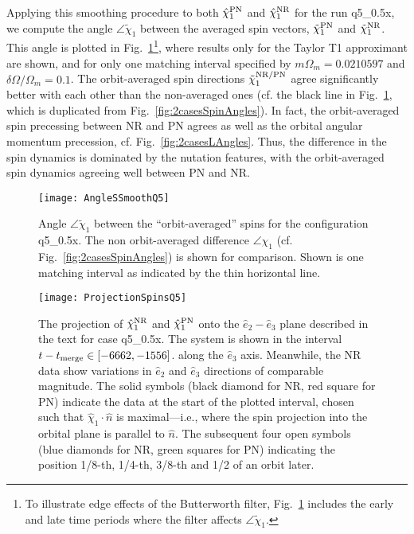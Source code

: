 \documentclass[aps,prd,amsmath,floatfix,twocolumn,superscriptaddress,nofootinbib,showpacs]{revtex4-1}
\begin{document}
Applying this smoothing procedure to both $\hat\chi_1^{\rm PN}$ and
$\hat\chi_1^{\rm NR}$ for the run q5\_0.5x, we compute the angle
$\angle\tilde\chi_1$ between the averaged spin vectors,
$\tilde\chi_1^{\rm PN}$ and $\tilde\chi_1^{\rm NR}$.  This angle is
plotted in Fig.~\ref{fig:AngleSmoothedS2cases}\footnote{To illustrate
  edge effects of the Butterworth filter,
  Fig.~\ref{fig:AngleSmoothedS2cases} includes the early and late time
  periods where the filter affects $\angle\tilde\chi_1$.}, where
results only for the Taylor T1 approximant are shown, and for only one
matching interval specified by $m\Omega_m=0.0210597$ and
$\delta\Omega/\Omega_m=0.1$. The orbit-averaged spin directions
$\tilde\chi_1^{\rm NR/PN}$ agree significantly better with each other
than the non-averaged ones (cf. the black line in
Fig.~\ref{fig:AngleSmoothedS2cases}, which is duplicated from
Fig.~\ref{fig:2casesSpinAngles}).  In fact, the orbit-averaged spin
precessing between NR and PN agrees as well as the orbital angular
momentum precession, cf. Fig.~\ref{fig:2casesLAngles}.  Thus, the
difference in the spin dynamics is dominated by the nutation features,
with the orbit-averaged spin dynamics agreeing well between PN and NR.


\begin{figure}
  \texttt{[image: AngleSSmoothQ5]}
  \caption{ \label{fig:AngleSmoothedS2cases} Angle $\angle
    \tilde{\chi}_{1}$ between the ``orbit-averaged'' spins for the
    configuration q5\_0.5x.  The non orbit-averaged difference
    $\angle\chi_{1}$ (cf. Fig.~\ref{fig:2casesSpinAngles}) is shown
    for comparison.  Shown is one matching interval as indicated by
    the thin horizontal line.  }
\end{figure}


\begin{figure}
  \texttt{[image: ProjectionSpinsQ5]}
  \caption{ \label{fig:ProjectionSpinsQ5} The projection of
    $\hat{\chi}_{1}^{\rm NR}$ and $\hat{\chi}_{1}^{\rm PN}$ onto the
    $\hat{e}_{2}-\hat{e}_{3}$ plane described in the text for case
    q5\_0.5x.  The system is shown in the interval $t-t_{\rm
      merge}\in[-6662,-1556]$.  along the $\hat{e}_{3}$
    axis. Meanwhile, the NR data show variations in $\hat{e}_{2}$ and
    $\hat{e}_{3}$ directions of comparable magnitude. The solid
    symbols (black diamond for NR, red square for PN) indicate the
    data at the start of the plotted interval, chosen such that
    $\hat\chi_1\cdot\hat n$ is maximal---i.e., where the spin
    projection into the orbital plane is parallel to $\hat n$.  The
    subsequent four open symbols (blue diamonds for NR, green squares
    for PN) indicating the position 1/8-th, 1/4-th, 3/8-th and 1/2 of
    an orbit later. }
\end{figure}
\end{document}

